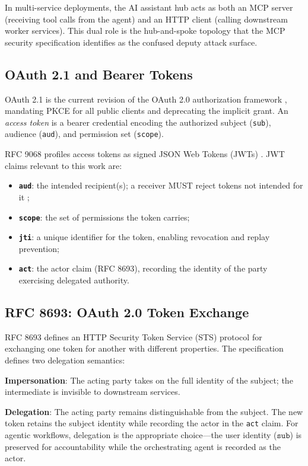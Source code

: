 \documentclass[journal]{IEEEtran}
\begin{document}
In multi-service deployments, the AI assistant hub acts as both an MCP server
(receiving tool calls from the agent) and an HTTP client (calling downstream
worker services). This dual role is the hub-and-spoke topology that the MCP
security specification identifies as the confused deputy attack surface.

\subsection{OAuth 2.1 and Bearer Tokens}

OAuth 2.1 \cite{oauth21} is the current revision of the OAuth 2.0 authorization
framework \cite{rfc6749}, mandating PKCE for all public clients and deprecating
the implicit grant. An \textit{access token} is a bearer credential encoding the
authorized subject (\texttt{sub}), audience (\texttt{aud}), and permission set
(\texttt{scope}).

RFC 9068 \cite{rfc9068} profiles access tokens as signed JSON Web Tokens (JWTs)
\cite{rfc7519}. JWT claims relevant to this work are:
\begin{itemize}
  \item \textbf{\texttt{aud}}: the intended recipient(s); a receiver MUST reject
        tokens not intended for it \cite{rfc9068};
  \item \textbf{\texttt{scope}}: the set of permissions the token carries;
  \item \textbf{\texttt{jti}}: a unique identifier for the token, enabling
        revocation and replay prevention;
  \item \textbf{\texttt{act}}: the actor claim (RFC 8693), recording the identity
        of the party exercising delegated authority.
\end{itemize}

\subsection{RFC 8693: OAuth 2.0 Token Exchange}

RFC 8693 \cite{rfc8693} defines an HTTP Security Token Service (STS) protocol
for exchanging one token for another with different properties. The specification
defines two delegation semantics:

\textbf{Impersonation}: The acting party takes on the full identity of the
subject; the intermediate is invisible to downstream services.

\textbf{Delegation}: The acting party remains distinguishable from the subject.
The new token retains the subject identity while recording the actor in the
\texttt{act} claim. For agentic workflows, delegation is the appropriate
choice---the user identity ($\texttt{sub}$) is preserved for accountability while
the orchestrating agent is recorded as the actor.
\end{document}

